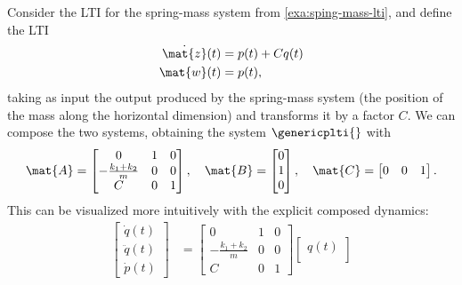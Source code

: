 \begin{example}
    Consider the LTI for the spring-mass system from \cref{exa:sping-mass-lti}, and define the LTI
    \begin{equation*}
        \begin{aligned}
            \dot{\mat{z}}(t) & =p(t)+Cq(t) \\
            \mat{w}(t)       & =p(t),
        \end{aligned}
    \end{equation*}
    taking as input the output produced by the spring-mass system (the position of the mass along the horizontal dimension) and transforms it by a factor $C$.
    We can compose the two systems, obtaining the system $\genericplti{}$ with
    \begin{equation*}
        \mat{A}=\begin{bmatrix}0                  & 1 & 0 \\
               -\frac{k_1+k_2}{m} & 0 & 0 \\
               C                  & 0 & 1\end{bmatrix},\quad
        \mat{B}=\begin{bmatrix}
            0 \\
            1 \\
            0
        \end{bmatrix},
        \quad
        \mat{C}=\begin{bmatrix}
            0 & 0 & 1
        \end{bmatrix}.
    \end{equation*}
    This can be visualized more intuitively with the explicit composed dynamics:
    \begin{equation*}
        \begin{aligned}
            \begin{bmatrix}
                \dot{q}(t)  \\
                \ddot{q}(t) \\
                \dot{p}(t)
            \end{bmatrix} & =
            \begin{bmatrix}0                  & 1 & 0 \\
               -\frac{k_1+k_2}{m} & 0 & 0 \\
               C                  & 0 & 1\end{bmatrix} \begin{bmatrix}
                                                        {q}(t)     \\

\end{bmatrix}
\end{aligned}
\end{equation*}
\end{example}
